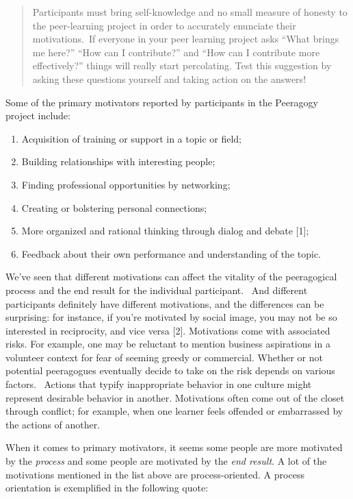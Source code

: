 \begin{quote}
Participants must bring self-knowledge and no small measure of honesty
to the peer-learning project in order to accurately enunciate their
motivations.~If everyone in your peer learning project asks ``What
brings me here?'' ``How can I contribute?'' and ``How can I contribute
more effectively?'' things will really start percolating. Test this
suggestion by asking these questions yourself and taking action on the
answers!
\end{quote}

Some of the primary motivators reported by participants in the
Peeragogy project include:

\begin{enumerate}
\itemsep1pt\parskip0pt
\item
  Acquisition of training or support in a topic or field;
\item
  Building relationships with interesting people;
\item
  Finding professional opportunities by networking;
\item
  Creating or bolstering personal connections;
\item
  More organized and rational thinking through dialog and debate {[}1{]};
\item
  Feedback about their own performance and understanding of the topic.
\end{enumerate}

We've seen that different motivations can affect the vitality of the
peeragogical process and the end result for the individual participant.~
And different participants definitely have different motivations, and
the differences can be surprising: for instance, if you're motivated by
social image, you may not be so interested in reciprocity, and vice
versa {[}2{]}. Motivations come with associated risks. For example, one
may be reluctant to mention business aspirations in a volunteer context
for fear of seeming greedy or commercial.  Whether or not potential
peeragogues eventually decide to take on the risk depends on various
factors.~ Actions that typify inappropriate behavior in one culture
might represent desirable behavior in another. Motivations often come
out of the closet through conflict; for example, when one learner feels
offended or embarrassed by the actions of another.

When it comes to primary motivators, it seems some people are more
motivated by the \emph{process} and some people are motivated by the
\emph{end result}.  A lot of the motivations mentioned in the list
above are process-oriented.  A process orientation is exemplified in
the following quote:

